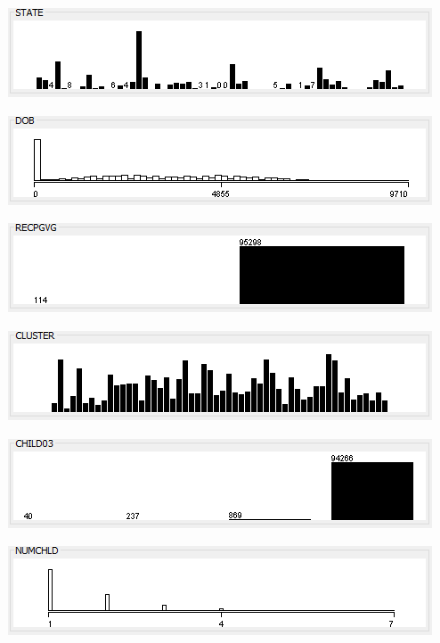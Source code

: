 \begin{figure}
\includegraphics{./images/expl_rep/Cattura-03-00}
\end{figure}
\begin{figure}
\includegraphics{./images/expl_rep/Cattura-03-01}
\end{figure}
\begin{figure}
\includegraphics{./images/expl_rep/Cattura-03-02}
\end{figure}
\begin{figure}
\includegraphics{./images/expl_rep/Cattura-03-03}
\end{figure}
\begin{figure}
\includegraphics{./images/expl_rep/Cattura-03-04}
\end{figure}
\begin{figure}
\includegraphics{./images/expl_rep/Cattura-03-05}
\end{figure}
